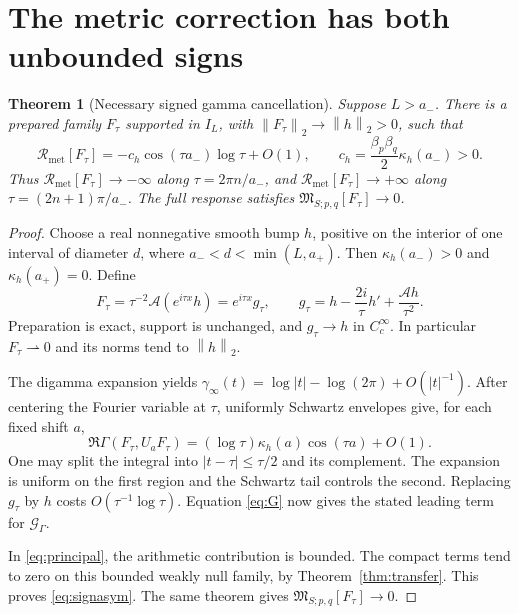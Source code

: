 \documentclass[11pt]{article}
\newtheorem{theorem}{Theorem}[section]
\theoremstyle{remark}
\newcommand{\Aprep}{\mathcal A}
\newcommand{\Mix}{\mathfrak M_{S;p,q}}
\newcommand{\Gform}{\mathcal G}
\newcommand{\Rmet}{\mathcal R_{\mathrm{met}}}
\newcommand{\norm}[1]{\left\lVert#1\right\rVert}
\numberwithin{equation}{section}
\begin{document}
\section{The metric correction has both unbounded signs}\label{sec:sign}

\begin{theorem}[Necessary signed gamma cancellation]\label{thm:sign}
Suppose \(L>a_-\). There is a prepared family \(F_\tau\) supported in
\(I_L\), with \(\norm{F_\tau}_2\to\norm h_2>0\), such that
\begin{equation}\label{eq:signasym}
 \Rmet[F_\tau]=-c_h\cos(\tau a_-)\log\tau+O(1),\qquad
 c_h=\frac{\beta_p\beta_q}{2}\kappa_h(a_-)>0 .
\end{equation}
Thus \(\Rmet[F_\tau]\to-\infty\) along \(\tau=2\pi n/a_-\), and
\(\Rmet[F_\tau]\to+\infty\) along \(\tau=(2n+1)\pi/a_-\).
The full response satisfies \(\Mix[F_\tau]\to0\).
\end{theorem}
\begin{proof}
Choose a real nonnegative smooth bump \(h\), positive on the interior of
one interval of diameter \(d\), where
\(a_-<d<\min(L,a_+)\). Then \(\kappa_h(a_-)>0\) and
\(\kappa_h(a_+)=0\). Define
\begin{equation}\label{eq:Ftau}
 F_\tau=\tau^{-2}\Aprep(e^{i\tau x}h)
       =e^{i\tau x}g_\tau,\qquad
 g_\tau=h-\frac{2i}{\tau}h'+\frac{\Aprep h}{\tau^2}.
\end{equation}
Preparation is exact, support is unchanged, and \(g_\tau\to h\) in
\(C_c^\infty\). In particular \(F_\tau\rightharpoonup0\) and its norms
tend to \(\norm h_2\).

The digamma expansion \cite[Equation 5.11.2]{dlmf} yields
\(\gamma_\infty(t)=\log|t|-\log(2\pi)+O(|t|^{-1})\).
After centering the Fourier variable at \(\tau\), uniformly Schwartz
envelopes give, for each fixed shift \(a\),
\[
 \Re\Gamma(F_\tau,U_aF_\tau)
       =(\log\tau)\kappa_h(a)\cos(\tau a)+O(1).
\]
One may split the integral into \(|t-\tau|\le\tau/2\) and its
complement. The expansion is uniform on the first region and the
Schwartz tail controls the second. Replacing \(g_\tau\) by \(h\) costs
\(O(\tau^{-1}\log\tau)\). Equation \eqref{eq:G} now gives the stated
leading term for \(\Gform_\Gamma\).

In \eqref{eq:principal}, the arithmetic contribution is bounded.
The compact terms tend to zero on this bounded weakly null family,
by Theorem~\ref{thm:transfer}. This proves \eqref{eq:signasym}.
The same theorem gives \(\Mix[F_\tau]\to0\).
\end{proof}
\end{document}
